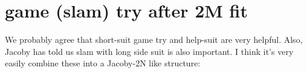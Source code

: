 \section{game (slam) try after 2M fit}

We probably agree that short-suit game try and help-suit are very helpful. 
Also, Jacoby has told us slam with long side suit is also important.
I think it's very easily combine these into a Jacoby-2N like structure:


